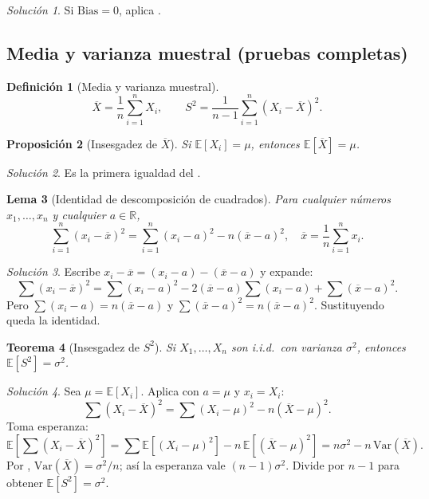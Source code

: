 \documentclass[11pt]{article}
\theoremstyle{plain}
\newtheorem{theorem}{Teorema}[section]
\newtheorem{lemma}[theorem]{Lema}
\newtheorem{proposition}[theorem]{Proposición}
\theoremstyle{definition}
\newtheorem{definition}[theorem]{Definición}
\theoremstyle{remark}
\theoremstyle{solstyle}
\newtheorem*{solution}{Solución}
\newcommand{\E}{\mathbb{E}}
\newcommand{\Var}{\mathrm{Var}}
\newcommand{\R}{\mathbb{R}}
\newcommand{\1}{\mathbbm{1}}
\newcommand{\Xbar}{\overline{X}}
\begin{document}
\begin{solution}
Si $\mathrm{Bias}=0$, aplica .
\end{solution}

\subsection{Media y varianza muestral (pruebas completas)}

\begin{definition}[Media y varianza muestral]
\[
\Xbar=\frac1n\sum_{i=1}^n X_i,
\qquad
S^2=\frac{1}{n-1}\sum_{i=1}^n (X_i-\Xbar)^2.
\]
\end{definition}

\begin{proposition}[Insesgadez de $\Xbar$]
Si $\E[X_i]=\mu$, entonces $\E[\Xbar]=\mu$.
\end{proposition}

\begin{solution}
Es la primera igualdad del .
\end{solution}

\begin{lemma}[Identidad de descomposición de cuadrados]\label{lem:ss-decomp}
Para cualquier números $x_1,\dots,x_n$ y cualquier $a\in\R$,
\[
\sum_{i=1}^n (x_i-\overline x)^2=\sum_{i=1}^n (x_i-a)^2 - n(\overline x-a)^2,
\quad \overline x=\frac1n\sum_{i=1}^n x_i.
\]
\end{lemma}

\begin{solution}
Escribe $x_i-\overline x=(x_i-a)-(\overline x-a)$ y expande:
\[
\sum (x_i-\overline x)^2=\sum (x_i-a)^2 -2(\overline x-a)\sum (x_i-a) + \sum(\overline x-a)^2.
\]
Pero $\sum (x_i-a)=n(\overline x-a)$ y $\sum(\overline x-a)^2=n(\overline x-a)^2$.
Sustituyendo queda la identidad.
\end{solution}

\begin{theorem}[Insesgadez de $S^2$]\label{thm:unbiasedS2}
Si $X_1,\dots,X_n$ son i.i.d.\ con varianza $\sigma^2$, entonces $\E[S^2]=\sigma^2$.
\end{theorem}

\begin{solution}
Sea $\mu=\E[X_i]$. Aplica  con $a=\mu$ y $x_i=X_i$:
\[
\sum (X_i-\Xbar)^2=\sum (X_i-\mu)^2 - n(\Xbar-\mu)^2.
\]
Toma esperanza:
\[
\E\!\left[\sum (X_i-\Xbar)^2\right]=\sum \E[(X_i-\mu)^2] - n\,\E[(\Xbar-\mu)^2]
=n\sigma^2 - n\,\Var(\Xbar).
\]
Por , $\Var(\Xbar)=\sigma^2/n$; así la esperanza vale $(n-1)\sigma^2$.
Divide por $n-1$ para obtener $\E[S^2]=\sigma^2$.
\end{solution}
\end{document}
